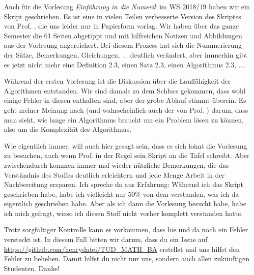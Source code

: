 Auch für die Vorlesung \textit{Einführung in die Numerik} im WS 2018/19 haben wir ein Skript geschrieben. Es ist eine in vielen Teilen verbesserte Version des Skriptes von Prof. , die uns leider nur in Papierform vorlag. Wir haben über das ganze Semester die 61 Seiten abgetippt und mit hilfreichen Notizen und Abbildungen aus der Vorlesung angereichert. Bei diesem Prozess hat sich die Nummerierung der Sätze, Bemerkungen, Gleichungen, ... deutlich verändert, aber immerhin gibt es jetzt nicht mehr eine Definition 2.3, einen Satz 2.3, einen Algorithmus 2.3, ....

Während der ersten Vorlesung ist die Diskussion über die Lauffähigkeit der Algorithmen entstanden. Wir sind damals zu dem Schluss gekommen, dass wohl einige Fehler in diesen enthalten sind, aber der grobe Ablauf stimmt überein. Es geht meiner Meinung nach (und wahrscheinlich auch der von Prof. ) darum, dass man sieht, wie lange ein Algorithmus braucht um ein Problem lösen zu können, also um die Komplexität des Algorithmus.

Wie eigentlich immer, will auch hier gesagt sein, dass es sich lohnt die Vorlesung zu besuchen, auch wenn Prof.  in der Regel sein Skript an die Tafel schreibt. Aber zwischendurch kommen immer mal wieder nützliche Bemerkungen, die das Verständnis des Stoffes deutlich erleichtern und jede Menge Arbeit in der Nachbereitung ersparen. Ich spreche da aus Erfahrung: Während ich das Skript geschrieben habe, habe ich vielleicht nur 50\% von dem verstanden, was ich da eigentlich geschrieben habe. Aber als ich dann die Vorlesung besucht habe, habe ich mich gefragt, wieso ich diesen Stoff nicht vorher komplett verstanden hatte.

Trotz sorgfältiger Kontrolle kann es vorkommen, dass hie und da noch ein Fehler versteckt ist. In diesem Fall bitten wir darum, dass du ein Issue auf \url{https://github.com/henrydatei/TUD_MATH_BA} erstellst und uns hilfst den Fehler zu beheben. Damit hilfst du nicht nur uns, sondern auch allen zukünftigen Studenten. Danke!